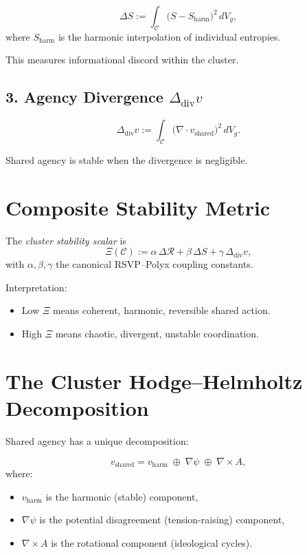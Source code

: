 \[
\Delta S
:= 
\int_{\mathcal{C}}
\bigl(S - S_{\mathrm{harm}}\bigr)^2 \, dV_g,
\]
where $S_{\mathrm{harm}}$ is the harmonic interpolation of individual entropies.

This measures informational discord within the cluster.


\subsection{3. Agency Divergence \texorpdfstring{$\Delta_{\mathrm{div}} v$}{Δdiv v}}

\[
\Delta_{\mathrm{div}} v
:= 
\int_{\mathcal{C}}
\bigl(\nabla\cdot v_{\mathrm{shared}}\bigr)^2 \, dV_g.
\]

Shared agency is stable when the divergence is negligible.


\section{Composite Stability Metric}

\begin{definition}
The \emph{cluster stability scalar} is
\[
\Xi(\mathcal{C})
:= 
\alpha\,\Delta\mathcal{R}
+
\beta\,\Delta S
+
\gamma\,\Delta_{\mathrm{div}} v,
\]
with $\alpha,\beta,\gamma$ the canonical RSVP–Polyx coupling constants.
\end{definition}

Interpretation:
\begin{itemize}
    \item Low $\Xi$ means coherent, harmonic, reversible shared action.
    \item High $\Xi$ means chaotic, divergent, unstable coordination.
\end{itemize}


\section{The Cluster Hodge–Helmholtz Decomposition}

Shared agency has a unique decomposition:

\[
v_{\mathrm{shared}}
=
v_{\mathrm{harm}}
\;\oplus\;
\nabla \psi
\;\oplus\;
\nabla\times A,
\]
where:
\begin{itemize}
    \item $v_{\mathrm{harm}}$ is the harmonic (stable) component,
    \item $\nabla\psi$ is the potential disagreement (tension-raising) component,
    \item $\nabla\times A$ is the rotational component (ideological cycles).
\end{itemize}

